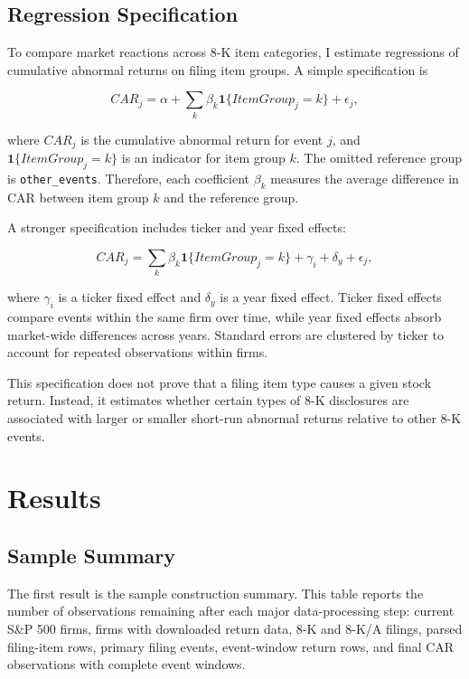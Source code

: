 \documentclass[12pt]{article}
\begin{document}
	\subsection{Regression Specification}
	
	To compare market reactions across 8-K item categories, I estimate regressions of cumulative abnormal returns on filing item groups. A simple specification is
	
	\begin{equation}
		CAR_{j} = \alpha + \sum_{k} \beta_k \mathbf{1}\{ItemGroup_j = k\} + \epsilon_j,
	\end{equation}
	
	where $CAR_j$ is the cumulative abnormal return for event $j$, and $\mathbf{1}\{ItemGroup_j = k\}$ is an indicator for item group $k$. The omitted reference group is \texttt{other\_events}. Therefore, each coefficient $\beta_k$ measures the average difference in CAR between item group $k$ and the reference group.
	
	A stronger specification includes ticker and year fixed effects:
	
	\begin{equation}
		CAR_{j} =
		\sum_{k} \beta_k \mathbf{1}\{ItemGroup_j = k\}
		+ \gamma_i
		+ \delta_y
		+ \epsilon_j,
	\end{equation}
	
	where $\gamma_i$ is a ticker fixed effect and $\delta_y$ is a year fixed effect. Ticker fixed effects compare events within the same firm over time, while year fixed effects absorb market-wide differences across years. Standard errors are clustered by ticker to account for repeated observations within firms.
	
	This specification does not prove that a filing item type causes a given stock return. Instead, it estimates whether certain types of 8-K disclosures are associated with larger or smaller short-run abnormal returns relative to other 8-K events.
	
	\section{Results}
	
	\subsection{Sample Summary}
	
	The first result is the sample construction summary. This table reports the number of observations remaining after each major data-processing step: current S\&P 500 firms, firms with downloaded return data, 8-K and 8-K/A filings, parsed filing-item rows, primary filing events, event-window return rows, and final CAR observations with complete event windows.
	
\end{document}
